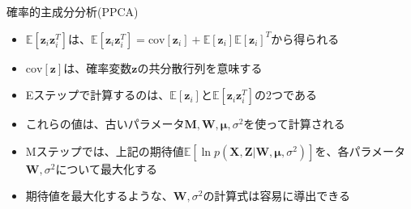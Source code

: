 \documentclass[dvipdfmx,notheorems,t]{beamer}
\begin{document}
\begin{frame}{確率的主成分分析(PPCA)}
\begin{itemize}
\begin{itemize}
		\item $\mathbb{E} \left[ \bm{z}_i \bm{z}_i^T \right]$は、$\mathbb{E} \left[ \bm{z}_i \bm{z}_i^T \right] = \mathrm{cov} \left[ \bm{z}_i \right] + \mathbb{E} \left[ \bm{z}_i \right] \mathbb{E} \left[ \bm{z}_i \right]^T$から得られる
		\item $\mathrm{cov} \left[ \bm{z} \right]$は、確率変数$\bm{z}$の共分散行列を意味する
		\newline
		
		\item \alert{Eステップ}で計算するのは、$\mathbb{E} \left[ \bm{z}_i \right]$と$\mathbb{E} \left[ \bm{z}_i \bm{z}_i^T \right]$の2つである
		\item これらの値は、古いパラメータ$\bm{M}, \bm{W}, \bm{\mu}, \sigma^2$を使って計算される
		\newline
		
		\item \alert{Mステップ}では、上記の期待値$\mathbb{E} \left[ \ln p(\bm{X}, \bm{Z} | \bm{W}, \bm{\mu}, \sigma^2) \right]$を、各パラメータ$\bm{W}, \sigma^2$について最大化する
		\item 期待値を最大化するような、$\bm{W}, \sigma^2$の計算式は\alert{容易に導出できる}
		\newline
		

\end{itemize}
\end{itemize}
\end{frame}
\end{document}
